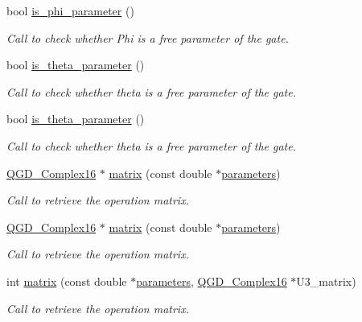 \begin{DoxyCompactItemize}
bool \hyperlink{class_u3_acc83ff7e4a15c2445344e051410ddcc4}{is\+\_\+phi\+\_\+parameter} ()
\begin{DoxyCompactList}\small\item\em Call to check whether Phi is a free parameter of the gate. \end{DoxyCompactList}\item 
bool \hyperlink{class_u3_a413ad816b0084c30d916576df56f4b40}{is\+\_\+theta\+\_\+parameter} ()
\begin{DoxyCompactList}\small\item\em Call to check whether theta is a free parameter of the gate. \end{DoxyCompactList}\item 
bool \hyperlink{class_u3_a413ad816b0084c30d916576df56f4b40}{is\+\_\+theta\+\_\+parameter} ()
\begin{DoxyCompactList}\small\item\em Call to check whether theta is a free parameter of the gate. \end{DoxyCompactList}\item 
\hyperlink{struct_q_g_d___complex16}{Q\+G\+D\+\_\+\+Complex16} $\ast$ \hyperlink{class_u3_a92b07b2d856a85bd6a706d4bfc071ac8}{matrix} (const double $\ast$\hyperlink{class_u3_a6b07be37e63be67b306393a90d759f70}{parameters})
\begin{DoxyCompactList}\small\item\em Call to retrieve the operation matrix. \end{DoxyCompactList}\item 
\hyperlink{struct_q_g_d___complex16}{Q\+G\+D\+\_\+\+Complex16} $\ast$ \hyperlink{class_u3_aed5a63e532aa5db290e3455e83f4f8e7}{matrix} (const double $\ast$\hyperlink{class_u3_a6b07be37e63be67b306393a90d759f70}{parameters})
\begin{DoxyCompactList}\small\item\em Call to retrieve the operation matrix. \end{DoxyCompactList}\item 
int \hyperlink{class_u3_afd2e3973d7199252fe139fb214087ea4}{matrix} (const double $\ast$\hyperlink{class_u3_a6b07be37e63be67b306393a90d759f70}{parameters}, \hyperlink{struct_q_g_d___complex16}{Q\+G\+D\+\_\+\+Complex16} $\ast$U3\+\_\+matrix)
\begin{DoxyCompactList}\small\item\em Call to retrieve the operation matrix. \end{DoxyCompactList}\item 

\end{DoxyCompactItemize}
